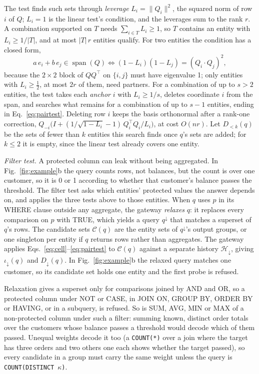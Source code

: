 \documentclass[sigconf,nonacm]{acmart}
\begin{document}
The test finds such sets through \emph{leverage} $L_i=\lVert Q_i\rVert^2$, the squared norm of row $i$ of $Q$; $L_i=1$ is the linear test's condition, and the leverages sum to the rank $r$. A combination supported on $T$ needs $\sum_{i\in T}L_i\ge1$, so $T$ contains an entity with $L_i\ge1/|T|$, and at most $|T|\,r$ entities qualify. For two entities the condition has a closed form,
\begin{equation}\label{eq:pairtest}
a\,e_i+b\,e_j\in\operatorname{span}(Q)\iff (1-L_i)(1-L_j)=(Q_i\cdot Q_j)^2 ,
\end{equation}
because the $2\times2$ block of $QQ^{\top}$ on $\{i,j\}$ must have eigenvalue 1; only entities with $L_i\ge\frac12$, at most $2r$ of them, need partners. For a combination of up to $s>2$ entities, the test takes each \emph{anchor} $i$ with $L_i\ge 1/s$, deletes coordinate $i$ from the span, and searches what remains for a combination of up to $s-1$ entities, ending in Eq.~\ref{eq:pairtest}. Deleting row $i$ keeps the basis orthonormal after a rank-one correction, $Q_{-i}\bigl(I+(1/\sqrt{1-L_i}-1)\,Q_i^{\top}Q_i/L_i\bigr)$, at cost $O(nr)$. Let $D_{<k}(q)$ be the sets of fewer than $k$ entities this search finds once $q$'s sets are added; for $k\le2$ it is empty, since the linear test already covers one entity.

\emph{Filter test.} A protected column can leak without being aggregated. In Fig.~\ref{fig:example}b the query counts rows, not balances, but the count is over one customer, so it is 0 or 1 according to whether that customer's balance passes the threshold. The filter test asks which entities' protected values the answer depends on, and applies the three tests above to those entities. When $q$ uses $p$ in its WHERE clause outside any aggregate, the gateway \emph{relaxes} $q$: it replaces every comparison on $p$ with TRUE, which yields a query $q^{\downarrow}$ that matches a superset of $q$'s rows. The candidate sets $\mathcal{C}(q)$ are the entity sets of $q^{\downarrow}$'s output groups, or one singleton per entity if $q$ returns rows rather than aggregates. The gateway applies Eqs.~\ref{eq:cell}--\ref{eq:pairtest} to $\mathcal{C}(q)$ against a separate history $\mathcal{H}_{\downarrow}$, giving $\iota_{\downarrow}(q)$ and $D_{\downarrow}(q)$. In Fig.~\ref{fig:example}b the relaxed query matches one customer, so its candidate set holds one entity and the first probe is refused.

Relaxation gives a superset only for comparisons joined by AND and OR, so a protected column under NOT or CASE, in JOIN ON, GROUP BY, ORDER BY or HAVING, or in a subquery, is refused. So is SUM, AVG, MIN or MAX of a non-protected column under such a filter: summing known, distinct order totals over the customers whose balance passes a threshold would decode which of them passed. Unequal weights decode it too (a \texttt{COUNT(*)} over a join where the target has three orders and two others one each shows whether the target passed), so every candidate in a group must carry the same weight unless the query is \texttt{COUNT(DISTINCT}~$\kappa$\texttt{)}.
\end{document}
